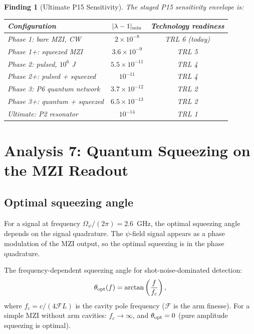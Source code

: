 \documentclass[11pt]{article}
\newtheorem{finding}{Finding}
\newcommand{\ee}[1]{\times 10^{#1}}
\newcommand{\Opsi}{\Omega_\psi}
\newcommand{\lam}{\lambda}
\begin{document}
\begin{finding}[Ultimate P15 Sensitivity]
\label{find:ultimate}
The staged P15 sensitivity envelope is:
\begin{center}
\begin{tabular}{lcc}
\toprule
Configuration & $|\lam-1|_{\rm min}$ & Technology readiness \\
\midrule
Phase 1: bare MZI, CW & $2\ee{-8}$ & TRL 6 (today) \\
Phase 1+: squeezed MZI & $3.6\ee{-9}$ & TRL 5 \\
Phase 2: pulsed, $10^6$ J & $5.5\ee{-11}$ & TRL 4 \\
Phase 2+: pulsed + squeezed & $10^{-11}$ & TRL 4 \\
Phase 3: P6 quantum network & $3.7\ee{-12}$ & TRL 2 \\
Phase 3+: quantum + squeezed & $6.5\ee{-13}$ & TRL 2 \\
Ultimate: P2 resonator & $10^{-14}$ & TRL 1 \\
\bottomrule
\end{tabular}
\end{center}
\end{finding}

\section{Analysis 7: Quantum Squeezing on the MZI Readout}
\label{sec:squeezing-detail}

\subsection{Optimal squeezing angle}

For a signal at frequency $\Opsi/(2\pi) = 2.6$~GHz, the optimal
squeezing angle depends on the signal quadrature. The $\psi$-field
signal appears as a phase modulation of the MZI output, so the
optimal squeezing is in the phase quadrature.

The frequency-dependent squeezing angle for shot-noise-dominated
detection:
\begin{equation}
\theta_{\rm opt}(f) = \arctan\left(\frac{f}{f_c}\right),
\end{equation}
where $f_c = c/(4\mathcal{F}L)$ is the cavity pole frequency
($\mathcal{F}$ is the arm finesse). For a simple MZI without arm
cavities: $f_c \to \infty$, and $\theta_{\rm opt} = 0$ (pure
amplitude squeezing is optimal).
\end{document}
